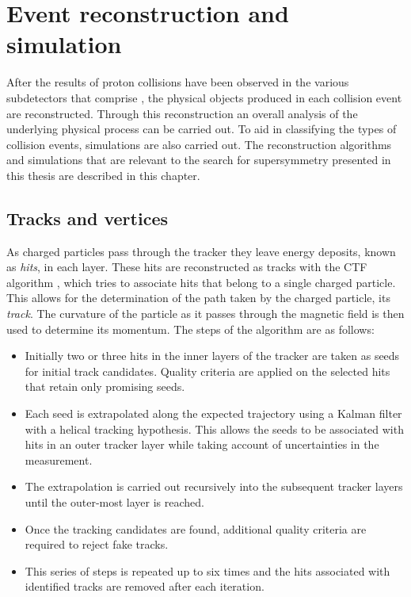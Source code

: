 \chapter{Event reconstruction and simulation}
\label{chap:reconstruction}

After the results of proton collisions have been observed in the
various subdetectors that comprise \CMS, the physical objects produced
in each collision event are reconstructed. Through this reconstruction
an overall analysis of the underlying physical process can be carried
out. To aid in classifying the types of collision events, \MC
simulations are also carried out. The reconstruction algorithms and
simulations that are relevant to the search for supersymmetry
presented in this thesis are described in this chapter.

\section{Tracks and vertices}
\label{sec:tracks_reco}

As charged particles pass through the \CMS tracker they leave energy
deposits, known as \emph{hits}, in each layer. These hits are
reconstructed as tracks with the \ac{CTF} algorithm
\cite{Chatrchyan:2014fea}, which tries to associate hits that belong
to a single charged particle. This allows for the determination of the
path taken by the charged particle, its \emph{track}. The curvature of
the particle as it passes through the magnetic field is then used to
determine its momentum. The steps of the algorithm are as follows:

\begin{itemize}
\item{Initially two or three hits in the inner layers of the tracker
are taken as seeds for initial track candidates. Quality
criteria are applied on the selected hits that retain only promising
seeds.} 
\item{Each seed is extrapolated along the expected trajectory using a
Kalman filter \cite{Fruhwirth:1987fm} with a helical tracking
hypothesis. This allows the seeds to be associated with hits in an
outer tracker layer while taking account of uncertainties in the
measurement.} 
\item{The extrapolation is carried out recursively into the subsequent
tracker layers until the outer-most layer is reached.} 
\item{Once the tracking candidates are found, additional quality
criteria are required to reject fake tracks.}
\item{This series of steps is repeated up to six times and the hits
associated with identified tracks are removed after each iteration. }
\end{itemize}

